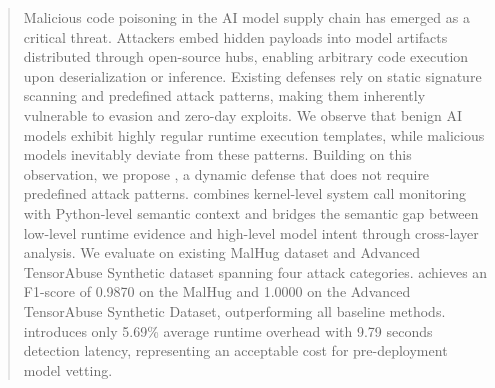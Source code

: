 \begin{abstract}
Malicious code poisoning in the AI model supply chain has emerged as a critical threat. Attackers embed hidden payloads into model artifacts distributed through open-source hubs, enabling arbitrary code execution upon deserialization or inference. Existing defenses rely on static signature scanning and predefined attack patterns, making them inherently vulnerable to evasion and zero-day exploits.
We observe that benign AI models exhibit highly regular runtime execution templates, while malicious models inevitably deviate from these patterns. Building on this observation, we propose \toolname{}, a dynamic defense that does not require predefined attack patterns. \toolname{} combines kernel-level system call monitoring with Python-level semantic context and bridges the semantic gap between low-level runtime evidence and high-level model intent through cross-layer analysis.
We evaluate \toolname{} on existing MalHug dataset and Advanced TensorAbuse Synthetic dataset spanning four attack categories. \toolname{} achieves an F1-score of 0.9870 on the MalHug and 1.0000 on the Advanced TensorAbuse Synthetic Dataset, outperforming all baseline methods. \toolname{} introduces only 5.69\% average runtime overhead with 9.79 seconds detection latency, representing an acceptable cost for pre-deployment model vetting. 
\end{abstract}
